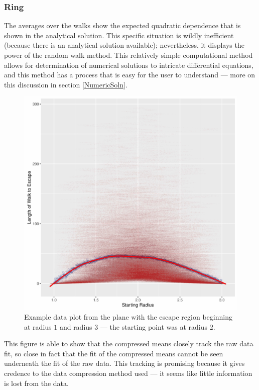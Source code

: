\documentclass{article}
\begin{document}
		\subsubsection{Ring}
			The averages over the walks show the expected quadratic dependence that is shown in the analytical solution.
			This specific situation is wildly inefficient (because there is an analytical solution available); nevertheless, it displays the power of the random walk method.
			This relatively simple computational method allows for determination of numerical solutions to intricate differential equations, and this method has a process that is easy for the user to understand --- more on this discussion in section \ref{NumericSoln}.
			\begin{figure}[h]
				\centering
				\includegraphics{images/Plane_In1_Out3_N1000_S005.pdf}
				\caption{Example data plot from the plane with the escape region beginning at radius $1$ and radius $3$ --- the starting point was at radius $2$.}
			\end{figure}
			This figure is able to show that the compressed means closely track the raw data fit, so close in fact that the fit of the compressed means cannot be seen underneath the fit of the raw data.
			This tracking is promising because it gives credence to the data compression method used --- it seems like little information is lost from the data.
\end{document}
